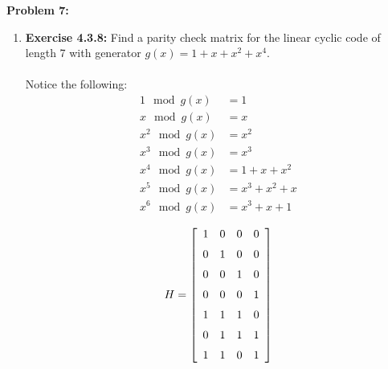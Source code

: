 \documentclass[11pt]{article}
\newcommand{\spacer}{\noalign{\medskip}}
\newenvironment{problem}[1]{\textbf{Problem #1: }}{\newpage}
\begin{document}
	\begin{problem}{7}
		\begin{enumerate}[label = (\alph*)]
			\item \textbf{Exercise 4.3.8: } Find a parity check matrix for the linear cyclic code of length 7 with generator $g(x) = 1 +x +x^2 +x^4$.
			\\ \\
			Notice the following:
			\begin{align*}
				1 \mod g(x) &= 1 \\
				x \mod g(x) &= x \\
				x^2 \mod g(x) &= x^2 \\
				x^3 \mod g(x) &= x^3 \\
				x^4 \mod g(x) &= 1+x+x^2 \\
				x^5 \mod g(x) &= x^3 +x^2 + x \\
				x^6 \mod g(x) &= x^3 + x + 1 \\
			\end{align*}
			\[H = \left[\begin{array}{cccc}
				1 & 0 & 0 & 0 \\
				\spacer 0 & 1 & 0 & 0\\
				\spacer0 & 0 & 1 & 0 \\
				\spacer0 & 0 & 0 & 1 \\
				\spacer1 & 1 & 1 & 0 \\
				\spacer0 & 1 & 1 & 1 \\
				\spacer1 & 1 & 0 & 1 \\
			\end{array}\right]\]
		\end{enumerate}
	\end{problem}
\end{document}
